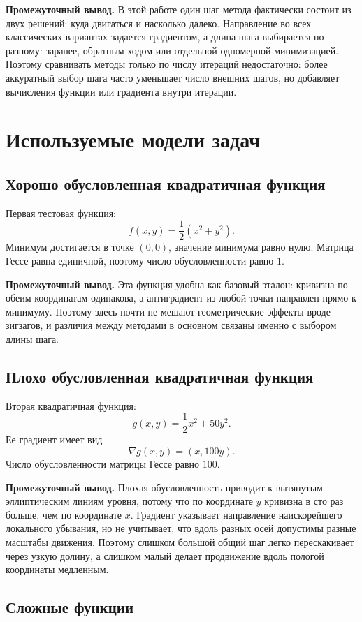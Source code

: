 \documentclass[14pt,a4paper]{extarticle}
\begin{document}
\textbf{Промежуточный вывод.} В этой работе один шаг метода фактически состоит из двух решений: куда двигаться и насколько далеко. Направление во всех классических вариантах задается градиентом, а длина шага выбирается по-разному: заранее, обратным ходом или отдельной одномерной минимизацией. Поэтому сравнивать методы только по числу итераций недостаточно: более аккуратный выбор шага часто уменьшает число внешних шагов, но добавляет вычисления функции или градиента внутри итерации.

\section{Используемые модели задач}

\subsection{Хорошо обусловленная квадратичная функция}

Первая тестовая функция:
\[
    f(x,y)=\frac{1}{2}(x^2+y^2).
\]
Минимум достигается в точке $(0,0)$, значение минимума равно нулю. Матрица Гессе равна единичной, поэтому число обусловленности равно $1$.

\textbf{Промежуточный вывод.} Эта функция удобна как базовый эталон: кривизна по обеим координатам одинакова, а антиградиент из любой точки направлен прямо к минимуму. Поэтому здесь почти не мешают геометрические эффекты вроде зигзагов, и различия между методами в основном связаны именно с выбором длины шага.

\subsection{Плохо обусловленная квадратичная функция}

Вторая квадратичная функция:
\[
    g(x,y)=\frac{1}{2}x^2+50y^2.
\]
Ее градиент имеет вид
\[
    \nabla g(x,y) = (x,100y).
\]
Число обусловленности матрицы Гессе равно $100$.

\textbf{Промежуточный вывод.} Плохая обусловленность приводит к вытянутым эллиптическим линиям уровня, потому что по координате $y$ кривизна в сто раз больше, чем по координате $x$. Градиент указывает направление наискорейшего локального убывания, но не учитывает, что вдоль разных осей допустимы разные масштабы движения. Поэтому слишком большой общий шаг легко перескакивает через узкую долину, а слишком малый делает продвижение вдоль пологой координаты медленным.

\subsection{Сложные функции}
\end{document}
